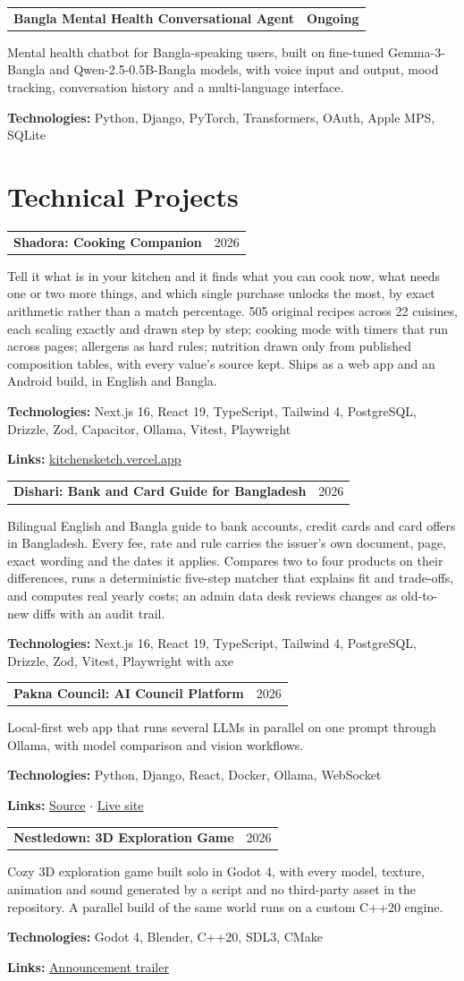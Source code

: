 \documentclass[10pt,letterpaper]{article}
\makeatletter
\newcommand{\entryhead}[2]{\par\needspace{4\baselineskip}\vspace{4pt}\noindent%
  \begin{tabular*}{\textwidth}[t]{@{}>{\raggedright\arraybackslash}p{0.72\textwidth}@{\extracolsep{\fill}}r@{}}
    \textbf{#1} & #2
  \end{tabular*}\par\vspace{1pt}}
\newcommand{\entry}[2]{\entryhead{#1}{\textbf{#2}}}
\newcommand{\entryplain}[2]{\entryhead{#1}{#2}}
\newcommand{\tech}[1]{\par\vspace{2pt}\noindent\textbf{Technologies:} #1\par}
\newcommand{\links}[1]{\par\vspace{2pt}\noindent\textbf{Links:} #1\par}
\newcommand{\gap}{\par\vspace{7pt}}
\let\origsection\section
\renewcommand{\section}[1]{\needspace{7\baselineskip}\origsection{#1}}
\makeatother
\begin{document}
\entry{Bangla Mental Health Conversational Agent}{Ongoing}
Mental health chatbot for Bangla-speaking users, built on fine-tuned Gemma-3-Bangla and
Qwen-2.5-0.5B-Bangla models, with voice input and output, mood tracking, conversation history and a
multi-language interface.
\tech{Python, Django, PyTorch, Transformers, OAuth, Apple MPS, SQLite}

\section{Technical Projects}

\entryplain{Shadora: Cooking Companion}{2026}
Tell it what is in your kitchen and it finds what you can cook now, what needs one or two more
things, and which single purchase unlocks the most, by exact arithmetic rather than a match
percentage. 505 original recipes across 22 cuisines, each scaling exactly and drawn step by step;
cooking mode with timers that run across pages; allergens as hard rules; nutrition drawn only from
published composition tables, with every value's source kept. Ships as a web app and an Android
build, in English and Bangla.
\tech{Next.js 16, React 19, TypeScript, Tailwind 4, PostgreSQL, Drizzle, Zod, Capacitor, Ollama, Vitest, Playwright}
\links{\href{https://kitchensketch.vercel.app}{kitchensketch.vercel.app}}
\gap

\entryplain{Dishari: Bank and Card Guide for Bangladesh}{2026}
Bilingual English and Bangla guide to bank accounts, credit cards and card offers in Bangladesh.
Every fee, rate and rule carries the issuer's own document, page, exact wording and the dates it
applies. Compares two to four products on their differences, runs a deterministic five-step matcher
that explains fit and trade-offs, and computes real yearly costs; an admin data desk reviews changes
as old-to-new diffs with an audit trail.
\tech{Next.js 16, React 19, TypeScript, Tailwind 4, PostgreSQL, Drizzle, Zod, Vitest, Playwright with axe}
\gap

\entryplain{Pakna Council: AI Council Platform}{2026}
Local-first web app that runs several LLMs in parallel on one prompt through Ollama, with model
comparison and vision workflows.
\tech{Python, Django, React, Docker, Ollama, WebSocket}
\links{\href{https://github.com/minhaz-42/Pakna_council}{Source} $\cdot$ \href{https://pakna-council.vercel.app/}{Live site}}
\gap

\entryplain{Nestledown: 3D Exploration Game}{2026}
Cozy 3D exploration game built solo in Godot 4, with every model, texture, animation and sound
generated by a script and no third-party asset in the repository. A parallel build of the same
world runs on a custom C++20 engine.
\tech{Godot 4, Blender, C++20, SDL3, CMake}
\links{\href{https://youtu.be/MUN7_kuh00U}{Announcement trailer}}
\gap
\end{document}
